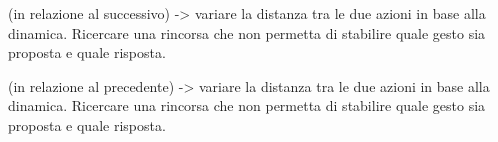 \documentclass{book}
\begin{document}
\begin{minipage}{0.2\textwidth}
\end{minipage}%
\begin{minipage}{0.6\textwidth}
\justify (in relazione al successivo) -> variare la distanza tra le due azioni in base alla dinamica. Ricercare una rincorsa che non permetta di stabilire quale gesto sia proposta e quale risposta.
\end{minipage}



\begin{minipage}{0.2\textwidth}
\end{minipage}%
\begin{minipage}{0.6\textwidth}
\justify (in relazione al precedente) -> variare la distanza tra le due azioni in base alla dinamica. Ricercare una rincorsa che non permetta di stabilire quale gesto sia proposta e quale risposta.
\end{minipage}
\end{document}
